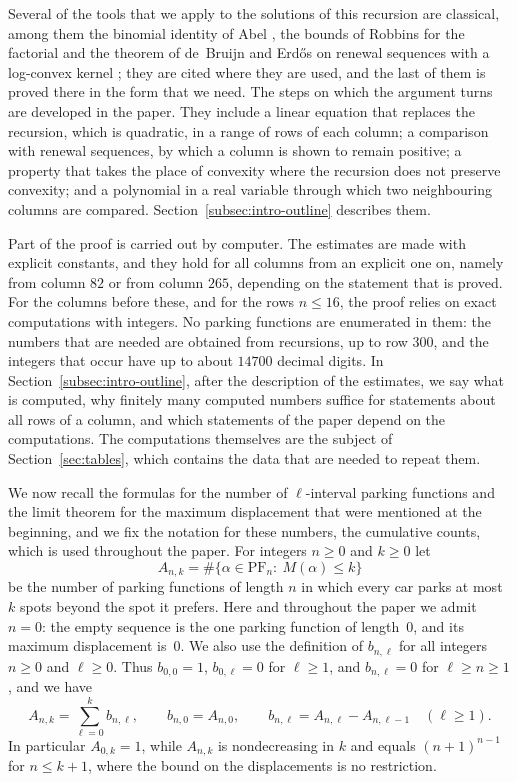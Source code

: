 \documentclass{amsart}
\makeatletter
\theoremstyle{definition}
\theoremstyle{remark}
\numberwithin{equation}{section}
\def\subsection{\@startsection{subsection}{2}\z@{.5\linespacing\@plus.7\linespacing}{-.5em}{\normalfont\bfseries\boldmath}}
\makeatother
\begin{document}
Several of the tools that we apply to the solutions of this recursion are classical, among them the binomial identity of Abel \cite{abel1826}, the bounds of Robbins for the factorial \cite{robbins1955} and the theorem of de~Bruijn and Erd\H{o}s on renewal sequences with a log-convex kernel \cite{debruijn1953}; they are cited where they are used, and the last of them is proved there in the form that we need. The steps on which the argument turns are developed in the paper. They include a linear equation that replaces the recursion, which is quadratic, in a range of rows of each column; a comparison with renewal sequences, by which a column is shown to remain positive; a property that takes the place of convexity where the recursion does not preserve convexity; and a polynomial in a real variable through which two neighbouring columns are compared. Section~\ref{subsec:intro-outline} describes them.

Part of the proof is carried out by computer. The estimates are made with explicit constants, and they hold for all columns from an explicit one on, namely from column $82$ or from column $265$, depending on the statement that is proved. For the columns before these, and for the rows $n\le 16$, the proof relies on exact computations with integers. No parking functions are enumerated in them: the numbers that are needed are obtained from recursions, up to row $300$, and the integers that occur have up to about $14700$ decimal digits. In Section~\ref{subsec:intro-outline}, after the description of the estimates, we say what is computed, why finitely many computed numbers suffice for statements about all rows of a column, and which statements of the paper depend on the computations. The computations themselves are the subject of Section~\ref{sec:tables}, which contains the data that are needed to repeat them.

\subsection{Cumulative counts and related results}\label{subsec:intro-related}

We now recall the formulas for the number of $\ell$-interval parking functions and the limit theorem for the maximum displacement that were mentioned at the beginning, and we fix the notation for these numbers, the cumulative counts, which is used throughout the paper. For integers $n\ge 0$ and $k\ge 0$ let
\[
A_{n,k}=\#\{\alpha\in\mathrm{PF}_n:\ M(\alpha)\le k\}
\]
be the number of parking functions of length $n$ in which every car parks at most $k$ spots beyond the spot it prefers. Here and throughout the paper we admit $n=0$: the empty sequence is the one parking function of length~$0$, and its maximum displacement is~$0$. We also use the definition of $b_{n,\ell}$ for all integers $n\ge 0$ and $\ell\ge 0$. Thus $b_{0,0}=1$, $b_{0,\ell}=0$ for $\ell\ge 1$, and $b_{n,\ell}=0$ for $\ell\ge n\ge 1$, and we have
\[
A_{n,k}=\sum_{\ell=0}^{k}b_{n,\ell},\qquad b_{n,0}=A_{n,0},\qquad b_{n,\ell}=A_{n,\ell}-A_{n,\ell-1}\quad(\ell\ge 1).
\]
In particular $A_{0,k}=1$, while $A_{n,k}$ is nondecreasing in $k$ and equals $(n+1)^{n-1}$ for $n\le k+1$, where the bound on the displacements is no restriction.
\end{document}
